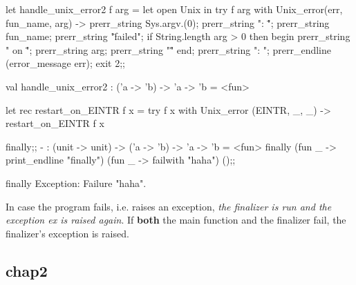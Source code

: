 \begin{enumerate}
  \begin{ocamlcode}
let handle_unix_error2 f arg = let open Unix in 
  try
     f arg
  with Unix_error(err, fun_name, arg) ->
  prerr_string Sys.argv.(0);
  prerr_string ": \"";
  prerr_string fun_name;
  prerr_string "\" failed";
  if String.length arg > 0 then begin
     prerr_string " on \"";
     prerr_string arg;
     prerr_string "\"" end;
     prerr_string ": ";
     prerr_endline (error_message err);
     exit 2;;  
   \end{ocamlcode}
   
   \begin{bluetext}
val handle_unix_error2 : ('a -> 'b) -> 'a -> 'b = <fun>     
\end{bluetext}

\begin{bluetext}
  let rec restart_on_EINTR f x =
  try f x with Unix_error (EINTR, _, _) -> restart_on_EINTR f x  
\end{bluetext}

\begin{alternate}
finally;;
- : (unit -> unit) -> ('a -> 'b) -> 'a -> 'b = <fun>
finally (fun _ -> print_endline "finally") (fun _ -> failwith "haha") ();;
\end{alternate}
\begin{ocamlcode}
finally
Exception: Failure "haha".
\end{ocamlcode}

In case the program fails, i.e. raises an exception, \textit{the finalizer is
run and the exception  ex is raised again}. If \textbf{both} the main function
and the finalizer fail, the finalizer's exception is raised.
\end{enumerate}

\subsection{chap2}
\label{sec:chap2}

